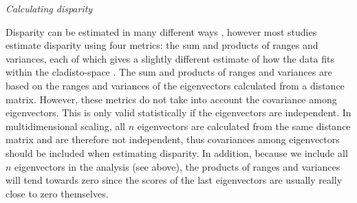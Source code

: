 \documentclass[12pt,letterpaper]{article}
\renewcommand{\subsection}[1]{%
\bigskip
\begin{center}
\begin{large}
\normalfont\itshape #1
\end{large}
\end{center}}
\begin{document}
\subsection{Calculating disparity}
Disparity can be estimated in many different ways \citep[e.g.][]{Wills1994,Ciampaglio2004,thorneresetting2011,hopkinsdecoupling2013,huang2015origins}, however most studies estimate disparity using four metrics: the sum and products of ranges and variances, each of which gives a slightly different estimate of how the data fits within the cladisto-space \citep{Foote01071994,Wills1994,brusatte50,Brusatte12092008,cisneros2010,thorneresetting2011,prentice2011,brusattedinosaur2012,toljagictriassic-jurassic2013,ruta2013,bentonmodels2014,bensonfaunal2014}.
The sum and products of ranges and variances are based on the ranges and variances of the eigenvectors calculated from a distance matrix. %
However, these metrics do not take into account the covariance among eigenvectors.
This is only valid statistically if the eigenvectors are independent.
In multidimensional scaling, all $n$ eigenvectors are calculated from the same distance matrix and are therefore not independent, thus covariances among eigenvectors should be included when estimating disparity.
In addition, because we include all $n$ eigenvectors in the analysis (see above), the products of ranges and variances will tend towards zero since the scores of the last eigenvectors are usually really close to zero themselves. 
\end{document}
